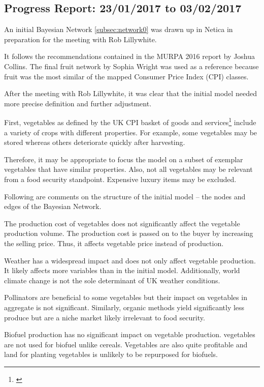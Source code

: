 \documentclass[12pt,notitlepage]{article}
\begin{document}
\begin{multicols}{2}
\subsection{Progress Report: 23/01/2017 to 03/02/2017}\label{subsec:progress2}
An initial Bayesian Network \ref{subsec:network0} was drawn up in Netica in preparation for the meeting with Rob Lillywhite.

It follows the recommendations contained in the MURPA 2016 report by Joshua Collins. The final fruit network by Sophia Wright was used as a reference because fruit was the most similar of the mapped Consumer Price Index (CPI) classes. 

After the meeting with Rob Lillywhite, it was clear that the initial model needed more precise definition and further adjustment.

First, vegetables as defined by the UK CPI basket of goods and services\footnote{\cite{ons2016a}} include a variety of crops with different properties. For example, some vegetables may be stored whereas others deteriorate quickly after harvesting.

Therefore, it may be appropriate to focus the model on a subset of exemplar vegetables that have similar properties. Also, not all vegetables may be relevant from a food security standpoint. Expensive luxury items may be excluded.

Following are comments on the structure of the initial model -- the nodes and edges of the Bayesian Network.

The production cost of vegetables does not significantly affect the vegetable production volume. The production cost is passed on to the buyer by increasing the selling price. Thus, it affects vegetable price instead of production.

Weather has a widespread impact and does not only affect vegetable production. It likely affects more variables than in the initial model. Additionally, world climate change is not the sole determinant of UK weather conditions.

Pollinators are beneficial to some vegetables but their impact on vegetables in aggregate is not significant. Similarly, organic methods yield significantly less produce but are a niche market likely irrelevant to food security.

Biofuel production has no significant impact on vegetable production. vegetables are not used for biofuel unlike cereals. Vegetables are also quite profitable and land for planting vegetables is unlikely to be repurposed for biofuels.


\end{multicols}
\end{document}
